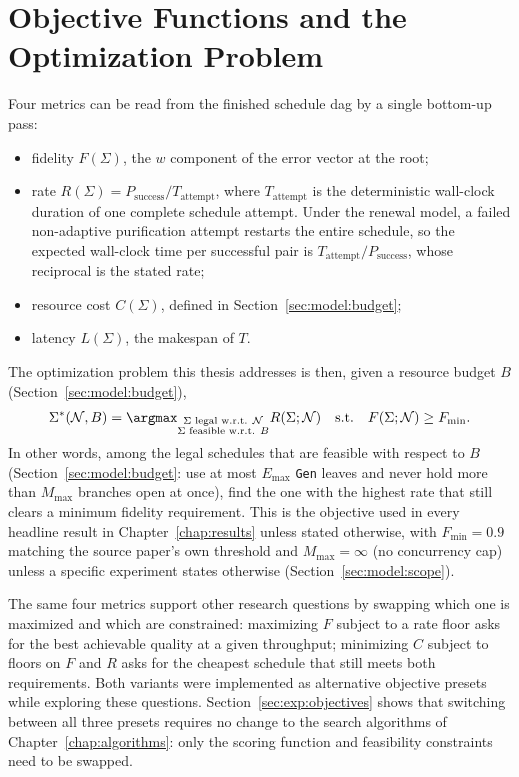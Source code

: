 \section{Objective Functions and the Optimization Problem}
\label{sec:model:objectives}


Four metrics can be read from the finished schedule \Gls{dag} by a single bottom-up pass:
\begin{itemize}
    \item fidelity $F(\Sigma)$, the $w$ component of the error vector at the root;
    \item rate $R(\Sigma) = P_{\mathrm{success}} / T_{\mathrm{attempt}}$, where $T_{\mathrm{attempt}}$ is the deterministic wall-clock duration of one complete schedule attempt. Under the renewal model, a failed non-adaptive purification attempt restarts the entire schedule, so the expected wall-clock time per successful pair is $T_{\mathrm{attempt}}/P_{\mathrm{success}}$, whose reciprocal is the stated rate;
    \item resource cost $C(\Sigma)$, defined in Section~\ref{sec:model:budget};
    \item latency $L(\Sigma)$, the makespan of $T$.
\end{itemize}


The optimization problem this thesis addresses is then, given a resource budget $B$ (Section~\ref{sec:model:budget}),
\[
    \Sigma^{*}(\mathcal{N}, B) = \argmax_{\substack{\Sigma \text{ legal w.r.t. } \mathcal{N} \\ \Sigma \text{ feasible w.r.t. } B}}
    R(\Sigma;\mathcal{N}) \quad \text{s.t.} \quad F(\Sigma;\mathcal{N}) \ge F_{\min}.
\]
In other words, among the legal schedules that are feasible with respect to $B$ (Section~\ref{sec:model:budget}: use at most $E_{\max}$ \texttt{Gen} leaves and never hold more than $M_{\max}$ branches open at once), find the one with the highest rate that still clears a minimum fidelity requirement. This is the objective used in every headline result in Chapter~\ref{chap:results} unless stated otherwise, with $F_{\min}=0.9$ matching the source paper's own threshold and $M_{\max}=\infty$ (no concurrency cap) unless a specific experiment states otherwise (Section~\ref{sec:model:scope}).

The same four metrics support other research questions by swapping which one is maximized and which are constrained: maximizing $F$ subject to a rate floor asks for the best achievable quality at a given throughput; minimizing $C$ subject to floors on $F$ and $R$ asks for the cheapest schedule that still meets both requirements. Both variants were implemented as alternative objective presets while exploring these questions. Section~\ref{sec:exp:objectives} shows that switching between all three presets requires no change to the search algorithms of Chapter~\ref{chap:algorithms}: only the scoring function and feasibility constraints need to be swapped.

